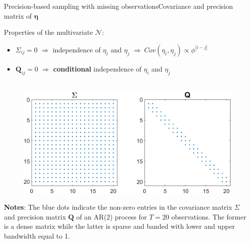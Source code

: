 \documentclass[xcolor=svgnames, 10pt, aspectratio=169]{beamer}
\begin{document}
\begin{frame}{Precision-based sampling with missing observations}{Covariance and precision matrix of $\boldsymbol{\eta}$}

    Properties of the multivariate $\mathcal{N}$: 

    \begin{itemize}
        \item $\Sigma_{ij} = 0$ $\Longrightarrow$ independence of $\eta_i$ and $\eta_j$ $\Rightarrow \:Cov(\eta_i, \eta_j) \propto \phi^{|i-j|}$
        \item $\mathbf{Q}_{ij} = 0$ $\Longrightarrow$ \textbf{conditional} independence of $\eta_i$ and $\eta_j$ \\~\\
    \end{itemize}    

    \begin{adjustbox}{minipage=0.7\textwidth,center}
        \begin{figure}
            \includegraphics[scale = 0.65]{fig_Sigma_Q.png}  \vspace{0.1cm} \\
        \end{figure}
            {\tiny \textbf{Notes}: The blue dots indicate the non-zero entries in the covariance matrix $\Sigma$ and precision matrix $\mathbf{Q}$ of an AR(2) process for $T=20$ observations. The former is a dense matrix while the latter is sparse and banded with lower and upper bandwidth equal to 1.}\par
    \end{adjustbox}
\end{frame}
\end{document}
